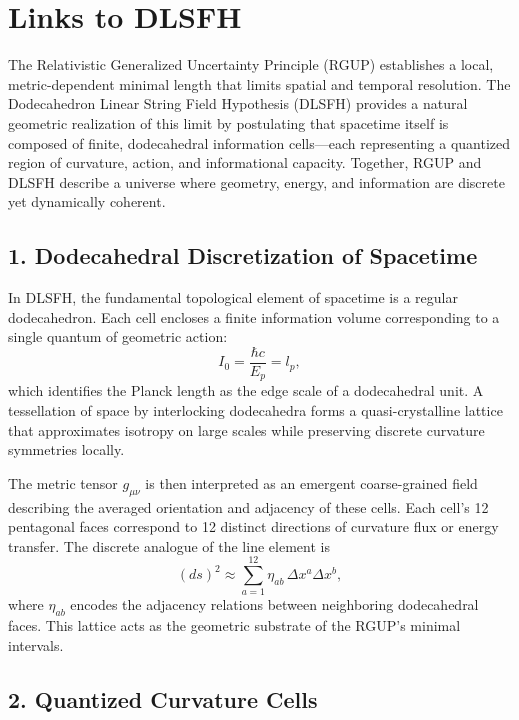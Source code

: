 \documentclass[11pt,oneside]{book}
\numberwithin{equation}{chapter}
\begin{document}
\section{Links to DLSFH}

The Relativistic Generalized Uncertainty Principle (RGUP) establishes a local, metric-dependent minimal length that limits spatial and temporal resolution.  
The Dodecahedron Linear String Field Hypothesis (DLSFH) provides a natural geometric realization of this limit by postulating that spacetime itself is composed of finite, dodecahedral information cells—each representing a quantized region of curvature, action, and informational capacity.  
Together, RGUP and DLSFH describe a universe where geometry, energy, and information are discrete yet dynamically coherent.

\subsection*{1. Dodecahedral Discretization of Spacetime}

In DLSFH, the fundamental topological element of spacetime is a regular dodecahedron.  
Each cell encloses a finite information volume corresponding to a single quantum of geometric action:
\begin{equation}
I_0 = \frac{\hbar c}{E_p} = l_p,
\end{equation}
which identifies the Planck length as the edge scale of a dodecahedral unit.  
A tessellation of space by interlocking dodecahedra forms a quasi-crystalline lattice that approximates isotropy on large scales while preserving discrete curvature symmetries locally.

The metric tensor $g_{\mu\nu}$ is then interpreted as an emergent coarse-grained field describing the averaged orientation and adjacency of these cells.  
Each cell’s 12 pentagonal faces correspond to 12 distinct directions of curvature flux or energy transfer.  
The discrete analogue of the line element is
\begin{equation}
(ds)^2 \approx \sum_{a=1}^{12} \eta_{ab}\,\Delta x^a \Delta x^b,
\end{equation}
where $\eta_{ab}$ encodes the adjacency relations between neighboring dodecahedral faces.  
This lattice acts as the geometric substrate of the RGUP’s minimal intervals.

\subsection*{2. Quantized Curvature Cells}
\end{document}
